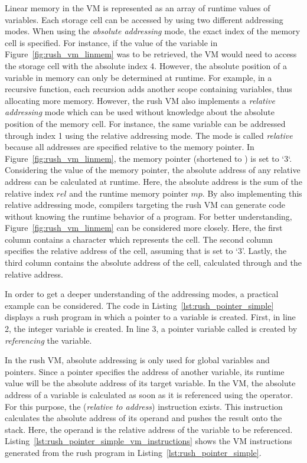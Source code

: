 Linear memory in the VM is represented as an array of runtime values of variables.
Each storage cell can be accessed by using two different addressing modes.
When using the \emph{absolute addressing} mode, the exact index of the memory cell is specified.
For instance, if the value of the variable  in Figure~\ref{fig:rush_vm_linmem} was to be retrieved,
the VM would need to access the storage cell with the absolute index 4.
However, the absolute position of a variable in memory can only be determined at runtime.
For example, in a recursive function, each recursion adds another scope containing variables, thus allocating more memory.
However, the rush VM also implements a \emph{relative addressing} mode which can be used without knowledge about the absolute position of the memory cell.
For instance, the same variable can be addressed through index 1 using the relative addressing mode.
The mode is called \emph{relative} because all addresses are specified relative to the memory pointer.
In Figure~\ref{fig:rush_vm_linmem}, the memory pointer (shortened to ) is set to `3`.
Considering the value of the memory pointer, the absolute address of any relative address can be calculated at runtime.
Here, the absolute address is the sum of the relative index $rel$ and the runtime memory pointer $mp$.
By also implementing this relative addressing mode,
compilers targeting the rush VM can generate code without knowing the runtime behavior of a program.
For better understanding, Figure~\ref{fig:rush_vm_linmem} can be considered more closely.
Here, the first column contains a character which represents the cell.
The second column specifies the relative address of the cell, assuming that  is set to `3'.
Lastly, the third column contains the absolute address of the cell, calculated through  and the relative address.

In order to get a deeper understanding of the addressing modes, a practical example can be considered.
The code in Listing~\ref{lst:rush_pointer_simple} displays a rush program in which a pointer to a variable is created.
First, in line 2, the integer variable  is created.
In line 3, a pointer variable called  is created by \emph{referencing} the  variable.


In the rush VM, absolute addressing is only used for global variables and pointers.
Since a pointer specifies the address of another variable, its runtime value will be the absolute address of its target variable.
In the VM, the absolute address of a variable is calculated as soon as it is referenced using the \qVerb{&} operator.
For this purpose, the  (\emph{relative to address}) instruction exists.
This instruction calculates the absolute address of its operand and pushes the result onto the stack.
Here, the operand is the relative address of the variable to be referenced.
Listing~\ref{lst:rush_pointer_simple_vm_instructions} shows the VM instructions generated from the rush program in Listing~\ref{lst:rush_pointer_simple}.

